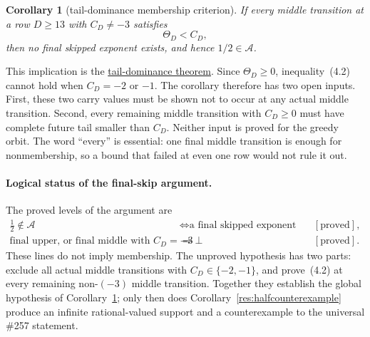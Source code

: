 \documentclass[11pt]{article}
\newcommand{\commit}{312b96c0d149ed466725c62d4ef24cfc91bca34e}
\newcommand{\repobase}{https://github.com/wcook04/plectis-lean-erdos249-257/blob/\commit}
\newcommand{\PK}{Erdos249257}
\newcommand{\lword}[4]{\href{\repobase/\PK/#1\#L#2}{#4}}
\newtheorem{corollary}[theorem]{Corollary}
\theoremstyle{definition}
\theoremstyle{remark}
\begin{document}
\begin{corollary}[tail-dominance membership criterion]\label{res:taildominance}
If every middle transition at a row \(D\geq13\) with \(C_D\neq-3\) satisfies
\[
 \Theta_D<C_D, \tag{4.2}
\]
then no final skipped exponent exists, and hence \(1/2\in\mathcal A\).
\end{corollary}
\noindent This implication is the
\lword{HalfCylinderLastProducerContradiction.lean}{436}{half_mem_mersenneAchievementSet_of_middleProducerTailEscapeExceptNegThree}{tail-dominance theorem}.
Since \(\Theta_D\geq0\), inequality~\textup{(4.2)} cannot hold when
\(C_D=-2\) or \(-1\).  The corollary therefore has two open inputs.  First,
these two carry values must be shown not to occur at any actual middle
transition.  Second, every remaining middle transition with \(C_D\geq0\)
must have complete future tail smaller than \(C_D\).  Neither input is proved
for the greedy orbit.  The word ``every'' is essential: one final middle
transition is enough for nonmembership, so a bound that failed at even one
row would not rule it out.

\paragraph{Logical status of the final-skip argument.}
The proved levels of the argument are
{\small\setlength{\arraycolsep}{3pt}
\[
\begin{array}{rcl}
 \frac12\notin\mathcal A
 &\Leftrightarrow
   \text{a final skipped exponent exists}
 &[\text{proved}],\\
 \text{final upper, or final middle with }C_D=-3
 &\Rightarrow\bot
 &[\text{proved}].
\end{array}
\]
}
These lines do not imply membership.  The unproved hypothesis has two parts:
exclude all actual middle transitions with \(C_D\in\{-2,-1\}\), and
prove~\textup{(4.2)} at every remaining non-\((-3)\) middle transition.
Together they establish the global hypothesis of
Corollary~\ref{res:taildominance}; only then does
Corollary~\ref{res:halfcounterexample} produce an infinite rational-valued
support and a counterexample to the universal \#257 statement.
\end{document}
